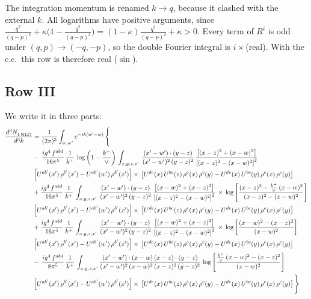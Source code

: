 \documentclass[9pt]{article}
\numberwithin{equation}{section}
\begin{document}
{\color{red}The integration momentum is renamed $k\to q$, because it clashed with the external $k$. All logarithms have positive arguments, since $\frac{q^{2}}{(q-p)^{2}}+\kappa\big(1-\frac{q^{2}}{(q-p)^{2}}\big)=(1-\kappa)\frac{q^{2}}{(q-p)^{2}}+\kappa>0$. Every term of $R^{i}$ is odd under $(q,p)\to(-q,-p)$, so the double Fourier integral is $i\times$(real). With the c.c.\ this row is therefore real ($\sin$).}
\subsection{Row III}
We write it in three parts:
\begin{align}
   \frac{d^{3}N_{1\,\rm NLO}^{\rm}}{d^{3}k}  & =  \frac{1}{(2\pi)^{3}}  \int_{w, w^\prime} e^{-ik(w^\prime-w)}\, \Bigg\{\notag \\
& -\,\frac{ig^{4}\,f^{abd}}{16\pi^{5}}\,\frac{1}{k^{+}}\,\log{\left(1-\frac{k^{+}}{\vee}\right)}\,\int_{x,y,z,x'}\, \frac{(x'-w')\cdot (y-z)}{(x'-w')^{2}\,(y-z)^{2}}\,\frac{\left[(x-z)^{2}+(x-w)^{2}\right]}{\left[(x-z)^{2}-(x-w)^{2}\right]^{2}}\notag \\ & \left[U^{ab'}(x')\,\rho^{b'}(x')-U^{ab'}(w')\, \rho^{b'}(x')\right]\times\, \left[U^{de}(x)\,U^{bc}(z)\, \rho^{e}(x)\,\rho^{c}(y)-U^{de}(x)\,U^{bc}(y)\,\rho^{e}(x)\,\rho^{c}(y)\right] \notag \\
&  +\frac{ig^{4}\,f^{abd}}{16\pi^{5}}\, \frac{1}{k^{+}}\,\int_{x,y,z,x'}\, \frac{(x'-w')\cdot (y-z)}{(x'-w')^{2}\,(y-z)^{2}}\, \frac{\left[(x-w)^{2}+(x-z)^{2}\right]}{\left[(x-z)^{2}-(x-w)^{2}\right]^{2}}\, \times\, \log{\left[\frac{(x-z)^{2}-\frac{k^{+}}{\vee}\,(x-w)^{2}}{(x-z)^{2}-(x-w)^{2}}\right]}\notag \\ & \left[U^{ab'}(x')\,\rho^{b'}(x')-U^{ab'}(w')\, \rho^{b'}(x')\right]\times\, \left[U^{de}(x)\,U^{bc}(z)\, \rho^{e}(x)\,\rho^{c}(y)-U^{de}(x)\,U^{bc}(y)\,\rho^{e}(x)\,\rho^{c}(y)\right] \notag \\
&  +\frac{ig^{4}\,f^{abd}}{16\pi^{5}}\, \frac{1}{k^{+}}\,\int_{x,y,z,x'}\, \frac{(x'-w')\cdot (y-z)}{(x'-w')^{2}\,(y-z)^{2}}\, \frac{\left[(x-w)^{2}+(x-z)^{2}\right]}{\left[(x-z)^{2}-(x-w)^{2}\right]^{2}}\, \times\, \log{\left[\frac{(x-w)^{2}-(x-z)^{2}}{(x-w)^{2}}\right]}\notag \\ & \left[U^{ab'}(x')\,\rho^{b'}(x')-U^{ab'}(w')\, \rho^{b'}(x')\right]\times\, \left[U^{de}(x)\,U^{bc}(z)\, \rho^{e}(x)\,\rho^{c}(y)-U^{de}(x)\,U^{bc}(y)\,\rho^{e}(x)\,\rho^{c}(y)\right] \notag \\
&-\, \frac{ig^{4}\,f^{abd}}{8\pi^{5}}\,\frac{1}{k^{+}}\,\int_{x,y,z,x'}\frac{(x'-w')\cdot (x-w)\, (x-z)\cdot (y-z)}{(x'-w')^{2}\, (x-w)^{2}\, (x-z)^{2}\, (y-z)^{2}}\,\log{\left[\frac{\frac{k^{+}}{\vee}\,(x-w)^{2}-(x-z)^{2}}{(x-w)^{2}}\right]} \notag \\ & \left[U^{ab'}(x')\,\rho^{b'}(x')-U^{ab'}(w')\, \rho^{b'}(x')\right]\times\, \left[U^{de}(x)\,U^{bc}(z)\, \rho^{e}(x)\,\rho^{c}(y)-U^{de}(x)\,U^{bc}(y)\,\rho^{e}(x)\,\rho^{c}(y)\right]\Bigg\}
\end{align}
\end{document}
